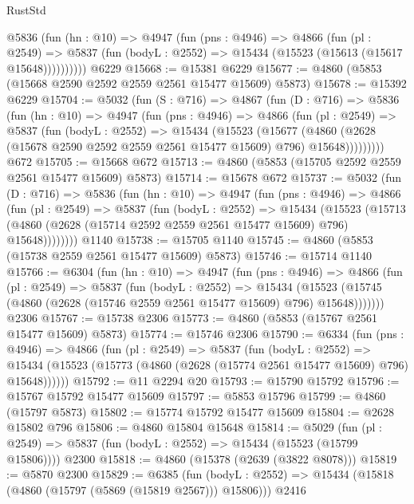 \begin{lexlean}{RustStd}
\begin{coremodule}
        @5836
          (fun (hn : @10) =>
          @4947
            (fun (pns : @4946) =>
            @4866
              (fun (pl : @2549) =>
              @5837 (fun (bodyL : @2552) => @15434 (@15523 (@15613 (@15617 @15648))))))))))
    @6229
@15668 := @15381 @6229
@15677 := @4860 (@5853 (@15668 @2590 @2592 @2559 @2561 @15477 @15609) @5873)
@15678 := @15392 @6229
@15704 := @5032
    (fun (S : @716) =>
    @4867
      (fun (D : @716) =>
      @5836
        (fun (hn : @10) =>
        @4947
          (fun (pns : @4946) =>
          @4866
            (fun (pl : @2549) =>
            @5837
              (fun (bodyL : @2552) =>
              @15434
                (@15523
                  (@15677
                    (@4860
                      (@2628 (@15678 @2590 @2592 @2559 @2561 @15477 @15609) @796)
                      @15648)))))))))
    @672
@15705 := @15668 @672
@15713 := @4860 (@5853 (@15705 @2592 @2559 @2561 @15477 @15609) @5873)
@15714 := @15678 @672
@15737 := @5032
    (fun (D : @716) =>
    @5836
      (fun (hn : @10) =>
      @4947
        (fun (pns : @4946) =>
        @4866
          (fun (pl : @2549) =>
          @5837
            (fun (bodyL : @2552) =>
            @15434
              (@15523
                (@15713 (@4860 (@2628 (@15714 @2592 @2559 @2561 @15477 @15609) @796) @15648))))))))
    @1140
@15738 := @15705 @1140
@15745 := @4860 (@5853 (@15738 @2559 @2561 @15477 @15609) @5873)
@15746 := @15714 @1140
@15766 := @6304
    (fun (hn : @10) =>
    @4947
      (fun (pns : @4946) =>
      @4866
        (fun (pl : @2549) =>
        @5837
          (fun (bodyL : @2552) =>
          @15434
            (@15523 (@15745 (@4860 (@2628 (@15746 @2559 @2561 @15477 @15609) @796) @15648)))))))
    @2306
@15767 := @15738 @2306
@15773 := @4860 (@5853 (@15767 @2561 @15477 @15609) @5873)
@15774 := @15746 @2306
@15790 := @6334
    (fun (pns : @4946) =>
    @4866
      (fun (pl : @2549) =>
      @5837
        (fun (bodyL : @2552) =>
        @15434 (@15523 (@15773 (@4860 (@2628 (@15774 @2561 @15477 @15609) @796) @15648))))))
@15792 := @11 @2294 @20
@15793 := @15790 @15792
@15796 := @15767 @15792 @15477 @15609
@15797 := @5853 @15796
@15799 := @4860 (@15797 @5873)
@15802 := @15774 @15792 @15477 @15609
@15804 := @2628 @15802 @796
@15806 := @4860 @15804 @15648
@15814 := @5029
    (fun (pl : @2549) => @5837 (fun (bodyL : @2552) => @15434 (@15523 (@15799 @15806))))
    @2300
@15818 := @4860 (@15378 (@2639 (@3822 @8078)))
@15819 := @5870 @2300
@15829 := @6385
    (fun (bodyL : @2552) => @15434 (@15818 (@4860 (@15797 (@5869 (@15819 @2567))) @15806)))
    @2416

\end{coremodule}
\end{lexlean}
